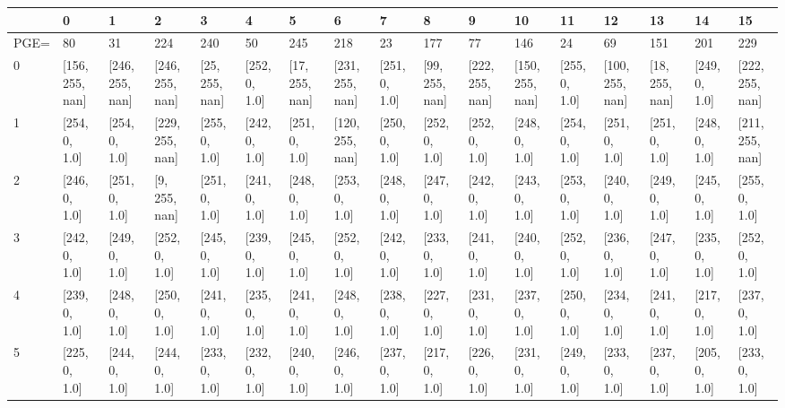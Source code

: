 \begin{tabular}{lllllllllllllllll}
\toprule
{} &               0  &               1  &               2  &              3  &             4  &              5  &               6  &             7  &              8  &               9  &               10 &             11 &               12 &              13 &             14 &               15 \\
\midrule
PGE= &               80 &               31 &              224 &             240 &             50 &             245 &              218 &             23 &             177 &               77 &              146 &             24 &               69 &             151 &            201 &              229 \\
0    &  [156, 255, nan] &  [246, 255, nan] &  [246, 255, nan] &  [25, 255, nan] &  [252, 0, 1.0] &  [17, 255, nan] &  [231, 255, nan] &  [251, 0, 1.0] &  [99, 255, nan] &  [222, 255, nan] &  [150, 255, nan] &  [255, 0, 1.0] &  [100, 255, nan] &  [18, 255, nan] &  [249, 0, 1.0] &  [222, 255, nan] \\
1    &    [254, 0, 1.0] &    [254, 0, 1.0] &  [229, 255, nan] &   [255, 0, 1.0] &  [242, 0, 1.0] &   [251, 0, 1.0] &  [120, 255, nan] &  [250, 0, 1.0] &   [252, 0, 1.0] &    [252, 0, 1.0] &    [248, 0, 1.0] &  [254, 0, 1.0] &    [251, 0, 1.0] &   [251, 0, 1.0] &  [248, 0, 1.0] &  [211, 255, nan] \\
2    &    [246, 0, 1.0] &    [251, 0, 1.0] &    [9, 255, nan] &   [251, 0, 1.0] &  [241, 0, 1.0] &   [248, 0, 1.0] &    [253, 0, 1.0] &  [248, 0, 1.0] &   [247, 0, 1.0] &    [242, 0, 1.0] &    [243, 0, 1.0] &  [253, 0, 1.0] &    [240, 0, 1.0] &   [249, 0, 1.0] &  [245, 0, 1.0] &    [255, 0, 1.0] \\
3    &    [242, 0, 1.0] &    [249, 0, 1.0] &    [252, 0, 1.0] &   [245, 0, 1.0] &  [239, 0, 1.0] &   [245, 0, 1.0] &    [252, 0, 1.0] &  [242, 0, 1.0] &   [233, 0, 1.0] &    [241, 0, 1.0] &    [240, 0, 1.0] &  [252, 0, 1.0] &    [236, 0, 1.0] &   [247, 0, 1.0] &  [235, 0, 1.0] &    [252, 0, 1.0] \\
4    &    [239, 0, 1.0] &    [248, 0, 1.0] &    [250, 0, 1.0] &   [241, 0, 1.0] &  [235, 0, 1.0] &   [241, 0, 1.0] &    [248, 0, 1.0] &  [238, 0, 1.0] &   [227, 0, 1.0] &    [231, 0, 1.0] &    [237, 0, 1.0] &  [250, 0, 1.0] &    [234, 0, 1.0] &   [241, 0, 1.0] &  [217, 0, 1.0] &    [237, 0, 1.0] \\
5    &    [225, 0, 1.0] &    [244, 0, 1.0] &    [244, 0, 1.0] &   [233, 0, 1.0] &  [232, 0, 1.0] &   [240, 0, 1.0] &    [246, 0, 1.0] &  [237, 0, 1.0] &   [217, 0, 1.0] &    [226, 0, 1.0] &    [231, 0, 1.0] &  [249, 0, 1.0] &    [233, 0, 1.0] &   [237, 0, 1.0] &  [205, 0, 1.0] &    [233, 0, 1.0] \\

\end{tabular}
